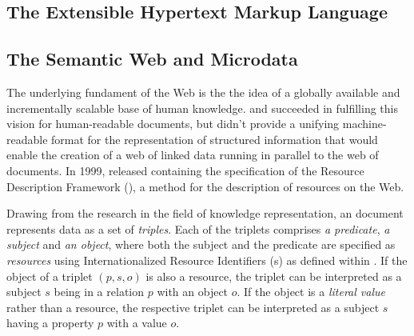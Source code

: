 \documentclass{book}
\begin{document}

      \subsection{The Extensible Hypertext Markup Language}

      \subsection{The Semantic Web and Microdata}
        The underlying fundament of the Web is the the idea of a globally
        available and incrementally scalable base of human knowledge.
         and  succeeded in fulfilling this vision
        for human-readable documents, but didn't provide a unifying
        machine-readable format for the representation of structured information
        that would enable the creation of a web of linked data running in
        parallel to the web of documents. In 1999,  released
        \cite{lassira99} containing the specification of the Resource
        Description Framework (), a method for the description of
        resources on the Web.

        Drawing from the research in the field of knowledge representation, an
         document represents data as a set of \emph{triples}. Each
        of the triplets comprises \emph{a predicate}, \emph{a subject} and
        \emph{an object}, where both the subject and the predicate are specified
        as \emph{resources} using Internationalized Resource Identifiers
        (s) as defined within \cite{rfc3987}. If the object of a
        triplet $(p,s,o)$ is also a resource, the triplet can be interpreted as
        a subject $s$ being in a relation $p$ with an object $o$. If the object
        is a \emph{literal value} rather than a resource, the respective triplet
        can be interpreted as a subject $s$ having a property $p$ with a value
        $o$.
\end{document}
